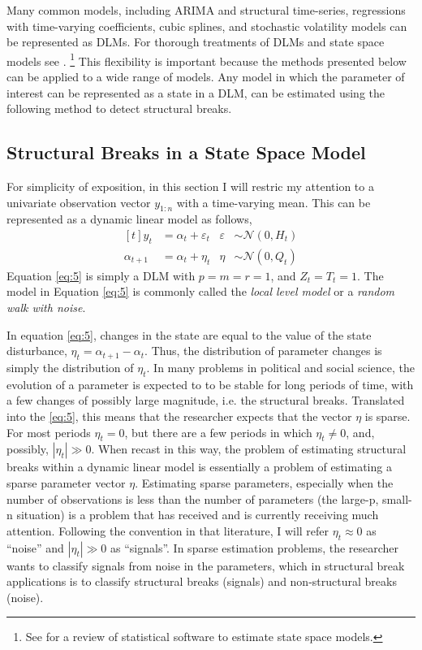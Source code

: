 \documentclass{article}
\newcommand{\dist}[1]{\mathcal{#1}}
\newcommand{\paren}[1]{\ensuremath{\left(#1\right)}}
\newcommand{\dnorm}[1]{\ensuremath{\dist{N}\paren{#1}}}
\begin{document}
Many common models, including ARIMA and structural time-series, regressions with time-varying coefficients, cubic splines, and stochastic volatility models can be represented as DLMs. 
For thorough treatments of DLMs and state space models see \textcites{WestHarrison1997}{DurbinKoopman2001}{PetrisPetroneEtAl2009}{CommandeurKoopman2007}.%
\footnote{See \textcite{CommandeurKoopmanOoms2011} for a review of statistical software to estimate state space models.}
This flexibility is important because the methods presented below can be applied to a wide range of models.
Any model in which the parameter of interest can be represented as a state in a DLM, can be estimated using the following method to detect structural breaks.


\subsection{Structural Breaks in a State Space Model}
\label{sec:struct-breaks-state}

For simplicity of exposition, in this section I will restric my attention to a univariate observation vector $y_{1:n}$ with a time-varying mean.
This can be represented as a dynamic linear model as follows,
\begin{equation}
  \label{eq:5}
  \begin{aligned}[t]
    y_{t} &= \alpha_{t} + \varepsilon_{t} & \varepsilon & \sim \dnorm{0, H_{t}} \\
    \alpha_{t + 1} &= \alpha_{t} + \eta_{t} & \eta & \sim \dnorm{0, Q_{t}}
  \end{aligned}
\end{equation}
Equation \eqref{eq:5} is simply a DLM with $p = m = r = 1$, and $Z_{t} = T_{t} = 1$.
The model in Equation \eqref{eq:5} is commonly called the \textit{local level model} or a \textit{random walk with noise}.

In equation \eqref{eq:5}, changes in the state are equal to the value of the state disturbance, $\eta_{t} = \alpha_{t+1} - \alpha_{t}$. 
Thus, the distribution of parameter changes is simply the distribution of $\eta_{t}$.
In many problems in political and social science, the evolution of a parameter is expected to to be stable for long periods of time, with a few changes of possibly large magnitude, i.e. the structural breaks.
Translated into the \eqref{eq:5}, this means that the researcher expects that the vector $\eta$ is sparse. 
For most periods $\eta_{t} = 0$, but there are a few periods in which $\eta_{t} \neq 0$, and, possibly,  $|\eta_{t}| \gg 0$.
When recast in this way, the problem of estimating structural breaks within a dynamic linear model is essentially a problem of estimating a sparse parameter vector $\eta$.
Estimating sparse parameters, especially when the number of observations is less than the number of parameters (the large-p, small-n situation) is a problem that has received and is currently receiving much attention.
Following the convention in that literature, I will refer $\eta_{t} \approx 0$ as ``noise'' and $|\eta_{t}| \gg 0$ as ``signals''.
In sparse estimation problems, the researcher wants to classify signals from noise in the parameters, which in structural break applications is to classify structural breaks (signals) and non-structural breaks (noise).
\end{document}
